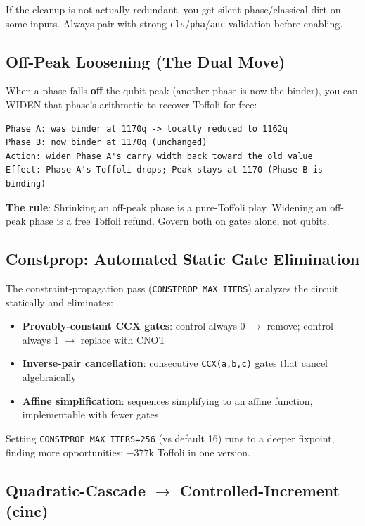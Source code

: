\documentclass[11pt,a4paper]{article}
\newcommand{\cls}{\texttt{cls}\xspace}
\newcommand{\pha}{\texttt{pha}\xspace}
\newcommand{\anc}{\texttt{anc}\xspace}
\begin{document}
\begin{tcolorbox}[noteboxstyle, title=Highest-risk move]
If the cleanup is not actually redundant, you get silent phase/classical dirt on some inputs.
Always pair with strong \cls/\pha/\anc{} validation before enabling.
\end{tcolorbox}

\subsection{Off-Peak Loosening (The Dual Move)}

When a phase falls \textbf{off} the qubit peak (another phase is now the binder), you can WIDEN
that phase's arithmetic to recover Toffoli for free:
\begin{lstlisting}
Phase A: was binder at 1170q -> locally reduced to 1162q
Phase B: now binder at 1170q (unchanged)
Action: widen Phase A's carry width back toward the old value
Effect: Phase A's Toffoli drops; Peak stays at 1170 (Phase B is binding)
\end{lstlisting}

\textbf{The rule}: Shrinking an off-peak phase is a pure-Toffoli play. Widening an off-peak phase
is a free Toffoli refund. Govern both on gates alone, not qubits.

\subsection{Constprop: Automated Static Gate Elimination}

The constraint-propagation pass (\texttt{CONSTPROP\_MAX\_ITERS}) analyzes the circuit statically
and eliminates:
\begin{itemize}
  \item \textbf{Provably-constant CCX gates}: control always 0 $\to$ remove; control always 1
    $\to$ replace with CNOT
  \item \textbf{Inverse-pair cancellation}: consecutive \texttt{CCX(a,b,c)} gates that cancel
    algebraically
  \item \textbf{Affine simplification}: sequences simplifying to an affine function, implementable
    with fewer gates
\end{itemize}

Setting \texttt{CONSTPROP\_MAX\_ITERS=256} (vs default 16) runs to a deeper fixpoint, finding
more opportunities: $-377$k Toffoli in one version.

\subsection{Quadratic-Cascade $\to$ Controlled-Increment (cinc)}
\label{sec:cinc}
\end{document}
